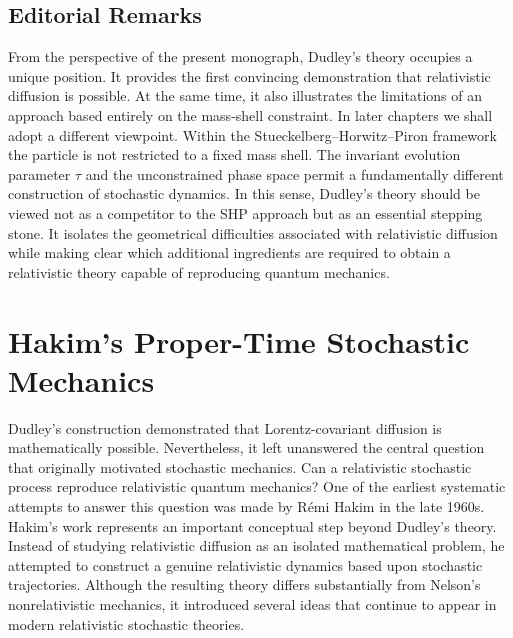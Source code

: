 \subsection{Editorial Remarks}
From the perspective of the present monograph, Dudley's theory occupies
a unique position.
It provides the first convincing demonstration that relativistic
diffusion is possible.
At the same time, it also illustrates the limitations of an approach
based entirely on the mass-shell constraint.
In later chapters we shall adopt a different viewpoint.
Within the Stueckelberg--Horwitz--Piron framework the particle is not
restricted to a fixed mass shell.
The invariant evolution parameter $\tau$ and the unconstrained phase
space permit a fundamentally different construction of stochastic
dynamics.
In this sense, Dudley's theory should be viewed not as a competitor to
the SHP approach but as an essential stepping stone. It isolates the
geometrical difficulties associated with relativistic diffusion while
making clear which additional ingredients are required to obtain a
relativistic theory capable of reproducing quantum mechanics.
\section{Hakim's Proper-Time Stochastic Mechanics}
\label{sec:Hakim}
Dudley's construction demonstrated that Lorentz-covariant diffusion is
mathematically possible. Nevertheless, it left unanswered the central
question that originally motivated stochastic mechanics.
Can a relativistic stochastic process reproduce relativistic quantum
mechanics?
One of the earliest systematic attempts to answer this question was
made by Rémi Hakim in the late 1960s.
Hakim's work represents an important conceptual step beyond Dudley's
theory.
Instead of studying relativistic diffusion as an isolated mathematical
problem, he attempted to construct a genuine relativistic dynamics based
upon stochastic trajectories.
Although the resulting theory differs substantially from Nelson's
nonrelativistic mechanics, it introduced several ideas that continue to
appear in modern relativistic stochastic theories.
